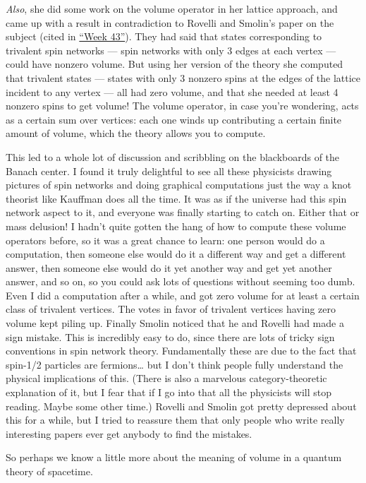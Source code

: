 \documentclass{article}
\begin{document}
\emph{Also}, she did some work on the volume operator in her lattice
approach, and came up with a result in contradiction to Rovelli and
Smolin's paper on the subject (cited in
\protect\hyperlink{week43}{``Week 43''}). They had said that states
corresponding to trivalent spin networks --- spin networks with only 3
edges at each vertex --- could have nonzero volume. But using her
version of the theory she computed that trivalent states --- states with
only 3 nonzero spins at the edges of the lattice incident to any vertex
--- all had zero volume, and that she needed at least 4 nonzero spins to
get volume! The volume operator, in case you're wondering, acts as a
certain sum over vertices: each one winds up contributing a certain
finite amount of volume, which the theory allows you to compute.

This led to a whole lot of discussion and scribbling on the blackboards
of the Banach center. I found it truly delightful to see all these
physicists drawing pictures of spin networks and doing graphical
computations just the way a knot theorist like Kauffman does all the
time. It was as if the universe had this spin network aspect to it, and
everyone was finally starting to catch on. Either that or mass delusion!
I hadn't quite gotten the hang of how to compute these volume operators
before, so it was a great chance to learn: one person would do a
computation, then someone else would do it a different way and get a
different answer, then someone else would do it yet another way and get
yet another answer, and so on, so you could ask lots of questions
without seeming too dumb. Even I did a computation after a while, and
got zero volume for at least a certain class of trivalent vertices. The
votes in favor of trivalent vertices having zero volume kept piling up.
Finally Smolin noticed that he and Rovelli had made a sign mistake. This
is incredibly easy to do, since there are lots of tricky sign
conventions in spin network theory. Fundamentally these are due to the
fact that spin-1/2 particles are fermions\ldots{} but I don't think
people fully understand the physical implications of this. (There is
also a marvelous category-theoretic explanation of it, but I fear that
if I go into that all the physicists will stop reading. Maybe some other
time.) Rovelli and Smolin got pretty depressed about this for a while,
but I tried to reassure them that only people who write really
interesting papers ever get anybody to find the mistakes.

So perhaps we know a little more about the meaning of volume in a
quantum theory of spacetime.
\end{document}
